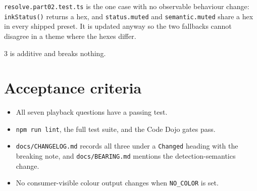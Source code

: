 \texttt{r\allowbreak{}e\allowbreak{}s\allowbreak{}o\allowbreak{}l\allowbreak{}v\allowbreak{}e\allowbreak{}.\allowbreak{}p\allowbreak{}a\allowbreak{}r\allowbreak{}t\allowbreak{}0\allowbreak{}2\allowbreak{}.\allowbreak{}t\allowbreak{}e\allowbreak{}s\allowbreak{}t\allowbreak{}.\allowbreak{}t\allowbreak{}s} is the one case with no observable behaviour change: \texttt{i\allowbreak{}n\allowbreak{}k\allowbreak{}S\allowbreak{}t\allowbreak{}a\allowbreak{}t\allowbreak{}u\allowbreak{}s\allowbreak{}(\allowbreak{})} returns a hex, and \texttt{s\allowbreak{}t\allowbreak{}a\allowbreak{}t\allowbreak{}u\allowbreak{}s\allowbreak{}.\allowbreak{}m\allowbreak{}u\allowbreak{}t\allowbreak{}e\allowbreak{}d} and \texttt{s\allowbreak{}e\allowbreak{}m\allowbreak{}a\allowbreak{}n\allowbreak{}t\allowbreak{}i\allowbreak{}c\allowbreak{}.\allowbreak{}m\allowbreak{}u\allowbreak{}t\allowbreak{}e\allowbreak{}d} share a hex in every shipped preset. It is updated anyway so the two fallbacks cannot disagree in a theme where the hexes differ.

3 is additive and breaks nothing.

\section{Acceptance criteria}\label{record-147-acceptance-criteria}

\begin{itemize}
\tightlist
\item
  All seven playback questions have a passing test.
\item
  \texttt{n\allowbreak{}p\allowbreak{}m\allowbreak{} \allowbreak{}r\allowbreak{}u\allowbreak{}n\allowbreak{} \allowbreak{}l\allowbreak{}i\allowbreak{}n\allowbreak{}t}, the full test suite, and the Code Dojo gates pass.
\item
  \texttt{d\allowbreak{}o\allowbreak{}c\allowbreak{}s\allowbreak{}/\allowbreak{}C\allowbreak{}H\allowbreak{}A\allowbreak{}N\allowbreak{}G\allowbreak{}E\allowbreak{}L\allowbreak{}O\allowbreak{}G\allowbreak{}.\allowbreak{}m\allowbreak{}d} records all three under a \texttt{C\allowbreak{}h\allowbreak{}a\allowbreak{}n\allowbreak{}g\allowbreak{}e\allowbreak{}d} heading with the breaking note, and \texttt{d\allowbreak{}o\allowbreak{}c\allowbreak{}s\allowbreak{}/\allowbreak{}B\allowbreak{}E\allowbreak{}A\allowbreak{}R\allowbreak{}I\allowbreak{}N\allowbreak{}G\allowbreak{}.\allowbreak{}m\allowbreak{}d} mentions the detection-semantics change.
\item
  No consumer-visible colour output changes when \texttt{N\allowbreak{}O\allowbreak{}\_\allowbreak{}C\allowbreak{}O\allowbreak{}L\allowbreak{}O\allowbreak{}R} is set.
\end{itemize}

